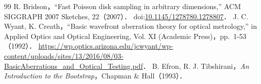 \begin{thebibliography}{99}
 R. Bridson，``Fast Poisson disk sampling in arbitrary dimensions,'' ACM SIGGRAPH 2007 Sketches, 22（2007）． doi:\href{https://doi.org/10.1145/1278780.1278807}{10.1145/1278780.1278807}．
 J. C. Wyant, K. Creath，``Basic wavefront aberration theory for optical metrology,'' in Applied Optics and Optical Engineering, Vol. XI (Academic Press)，pp.~1-53（1992）． \url{https://wp.optics.arizona.edu/jcwyant/wp-content/uploads/sites/13/2016/08/03-BasicAberrations_and_Optical_Testing.pdf}．
 B. Efron, R. J. Tibshirani，\textit{An Introduction to the Bootstrap}，Chapman \& Hall（1993）．
\end{thebibliography}
